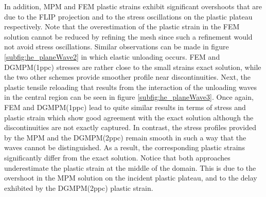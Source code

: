 In addition, MPM and FEM plastic strains exhibit significant overshoots that are due to the FLIP projection \cite{Thesis} and to the stress oscillations on the plastic plateau respectively.
Note that the overestimation of the plastic strain in the FEM solution cannot be reduced by refining the mesh since such a refinement would not avoid stress oscillations.
%
Similar observations can be made in figure \ref{subfig:he_planeWave2} in which elastic unloading occurs.
FEM and DGMPM(1ppc) stresses are rather close to the small strains exact solution, while the two other schemes provide smoother profile near discontinuities.
%
Next, the plastic tensile reloading that results from the interaction of the unloading waves in the central region can be seen in figure \ref{subfig:he_planeWave3}.
Once again, FEM and DGMPM(1ppc) lead to quite similar results in terms of stress and plastic strain which show good agreement with the exact solution although the discontinuities are not exactly captured.
In contrast, the stress profiles provided by the MPM and the DGMPM(2ppc) remain smooth in such a way that the waves cannot be distinguished.
As a result, the corresponding plastic strains significantly differ from the exact solution.
Notice that both approaches underestimate the plastic strain at the middle of the domain.
This is due to the overshoot in the MPM solution on the incident plastic plateau, and to the delay exhibited by the DGMPM(2ppc) plastic strain.

